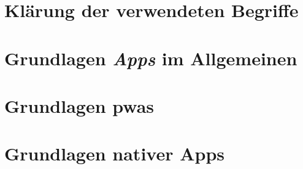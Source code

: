 \section{Klärung der verwendeten Begriffe} \label{sec:2-begriffe}


\section{Grundlagen \textit{Apps} im Allgemeinen} \label{sec:2-apps}


\section{Grundlagen \acfp{pwa}} \label{sec:2-pwa}


\section{Grundlagen nativer Apps} \label{sec:2-nativ}
